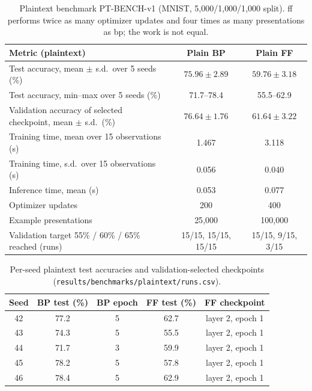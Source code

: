 \begin{table}[htbp]
\centering
\small
\begin{tabular}{@{}>{\raggedright\arraybackslash}p{8.4cm}cc@{}}
\toprule
Metric (plaintext) & Plain BP & Plain FF \\
\midrule
Test accuracy, mean $\pm$ s.d.\ over 5 seeds (\%) & $75.96\pm2.89$ & $59.76\pm3.18$ \\
Test accuracy, min--max over 5 seeds (\%) & 71.7--78.4 & 55.5--62.9 \\
Validation accuracy of selected checkpoint, mean $\pm$ s.d.\ (\%) & $76.64\pm1.76$ & $61.64\pm3.22$ \\
Training time, mean over 15 observations (s) & 1.467 & 3.118 \\
Training time, s.d.\ over 15 observations (s) & 0.056 & 0.040 \\
Inference time, mean (s) & 0.053 & 0.077 \\
Optimizer updates & 200 & 400 \\
Example presentations & 25{,}000 & 100{,}000 \\
Validation target 55\% / 60\% / 65\% reached (runs) & 15/15, 15/15, 15/15 & 15/15, 9/15, 3/15 \\
\bottomrule
\end{tabular}
\caption{Plaintext benchmark PT-BENCH-v1 (MNIST, 5{,}000/1{,}000/1{,}000 split). \ac{ff} performs twice as many optimizer updates and four times as many presentations as \ac{bp}; the work is not equal.}
\label{tab:res-plain}
\end{table}

\begin{table}[htbp]
\centering
\small
\begin{tabular}{@{}ccccc@{}}
\toprule
Seed & BP test (\%) & BP epoch & FF test (\%) & FF checkpoint \\
\midrule
42 & 77.2 & 5 & 62.7 & layer 2, epoch 1 \\
43 & 74.3 & 5 & 55.5 & layer 2, epoch 1 \\
44 & 71.7 & 3 & 59.9 & layer 2, epoch 1 \\
45 & 78.2 & 5 & 57.8 & layer 2, epoch 1 \\
46 & 78.4 & 5 & 62.9 & layer 2, epoch 1 \\
\bottomrule
\end{tabular}
\caption{Per-seed plaintext test accuracies and validation-selected checkpoints (\texttt{results/benchmarks/plaintext/runs.csv}).}
\label{tab:res-plain-seeds}
\end{table}

